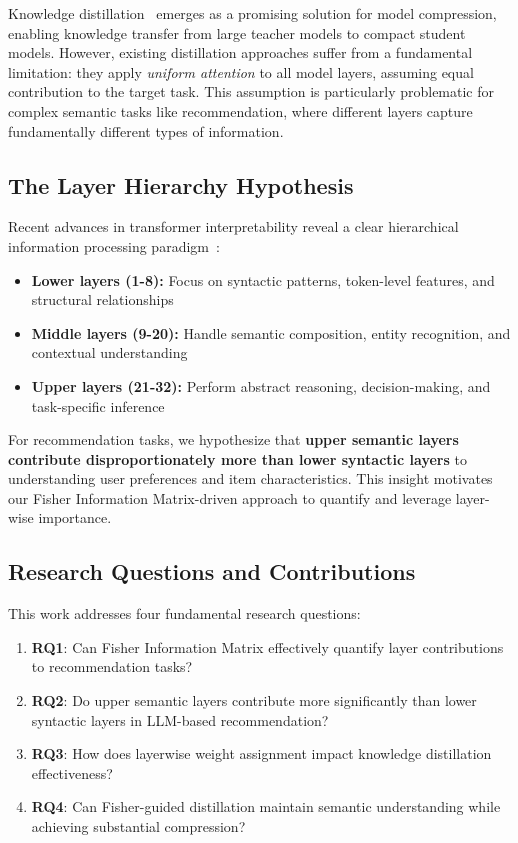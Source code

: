 \documentclass[10pt,conference]{IEEEtran}
\begin{document}
Knowledge distillation~\cite{hinton2015distilling} emerges as a promising solution for model compression, enabling knowledge transfer from large teacher models to compact student models. However, existing distillation approaches suffer from a fundamental limitation: they apply \textit{uniform attention} to all model layers, assuming equal contribution to the target task. This assumption is particularly problematic for complex semantic tasks like recommendation, where different layers capture fundamentally different types of information.

\subsection{The Layer Hierarchy Hypothesis}

Recent advances in transformer interpretability reveal a clear hierarchical information processing paradigm~\cite{rogers2020primer,tenney2019bert}: 
\begin{itemize}[leftmargin=*]
    \item \textbf{Lower layers (1-8):} Focus on syntactic patterns, token-level features, and structural relationships
    \item \textbf{Middle layers (9-20):} Handle semantic composition, entity recognition, and contextual understanding  
    \item \textbf{Upper layers (21-32):} Perform abstract reasoning, decision-making, and task-specific inference
\end{itemize}

For recommendation tasks, we hypothesize that \textbf{upper semantic layers contribute disproportionately more than lower syntactic layers} to understanding user preferences and item characteristics. This insight motivates our Fisher Information Matrix-driven approach to quantify and leverage layer-wise importance.

\subsection{Research Questions and Contributions}

This work addresses four fundamental research questions:

\begin{enumerate}[leftmargin=*]
    \item \textbf{RQ1}: Can Fisher Information Matrix effectively quantify layer contributions to recommendation tasks?
    \item \textbf{RQ2}: Do upper semantic layers contribute more significantly than lower syntactic layers in LLM-based recommendation?
    \item \textbf{RQ3}: How does layerwise weight assignment impact knowledge distillation effectiveness?
    \item \textbf{RQ4}: Can Fisher-guided distillation maintain semantic understanding while achieving substantial compression?
\end{enumerate}
\end{document}
